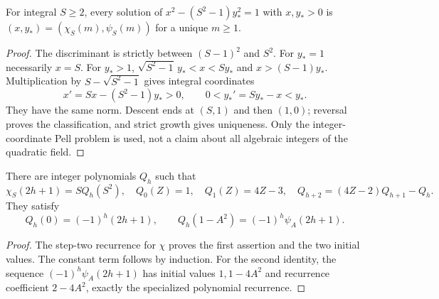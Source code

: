 \begin{lemma}\label{lem:pellclass}
For integral $S\ge2$, every solution of
$x^2-(S^2-1)y_*^2=1$ with $x,y_*>0$ is
$(x,y_*)=(\chi_S(m),\psi_S(m))$ for a unique $m\ge1$.
\end{lemma}
\begin{proof}
The discriminant is strictly between $(S-1)^2$ and $S^2$.
For $y_*=1$ necessarily $x=S$. For $y_*>1$,
$\sqrt{S^2-1}\,y_*<x<Sy_*$ and $x>(S-1)y_*$.
Multiplication by $S-\sqrt{S^2-1}$ gives integral coordinates
\[
 x'=Sx-(S^2-1)y_*>0,\qquad 0<y_*'=Sy_*-x<y_*.
\]
They have the same norm. Descent ends at $(S,1)$ and then $(1,0)$;
reversal proves the classification, and strict growth gives uniqueness.
Only the integer-coordinate Pell problem is used, not a claim about
all algebraic integers of the quadratic field.
\end{proof}

\begin{lemma}\label{lem:oddpoly}
There are integer polynomials $Q_h$ such that
\[
 \chi_S(2h+1)=S Q_h(S^2),\quad
 Q_0(Z)=1,\quad Q_1(Z)=4Z-3,\quad
 Q_{h+2}=(4Z-2)Q_{h+1}-Q_h.
\]
They satisfy
\begin{equation}\label{eq:Qidentities}
 Q_h(0)=(-1)^h(2h+1),\qquad
 Q_h(1-A^2)=(-1)^h\psi_A(2h+1).
\end{equation}
\end{lemma}
\begin{proof}
The step-two recurrence for $\chi$ proves the first assertion and
the two initial values. The constant term follows by induction.
For the second identity, the sequence $(-1)^h\psi_A(2h+1)$ has
initial values $1,1-4A^2$ and recurrence coefficient $2-4A^2$,
exactly the specialized polynomial recurrence.
\end{proof}

